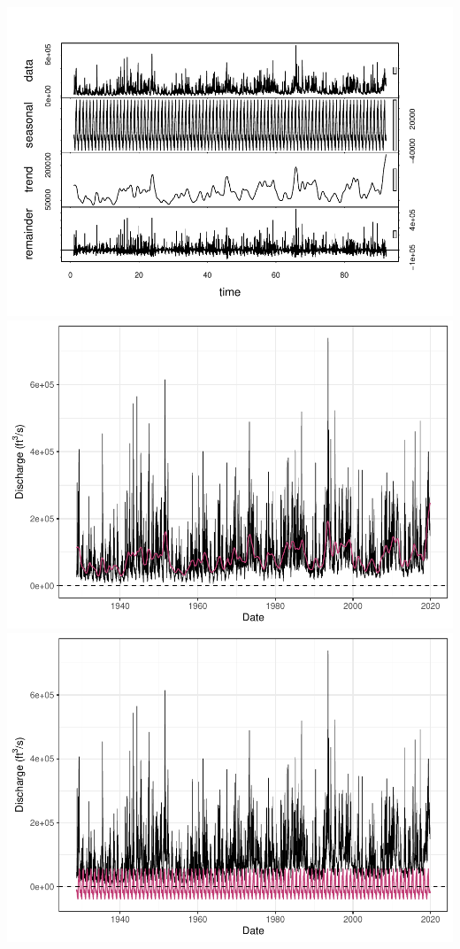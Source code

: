 \documentclass[12pt,]{article}
\begin{document}
\includegraphics{Project_Template_files/figure-latex/unnamed-chunk-6-11.pdf}
\includegraphics{Project_Template_files/figure-latex/unnamed-chunk-6-12.pdf}
\includegraphics{Project_Template_files/figure-latex/unnamed-chunk-6-13.pdf}
\end{document}
